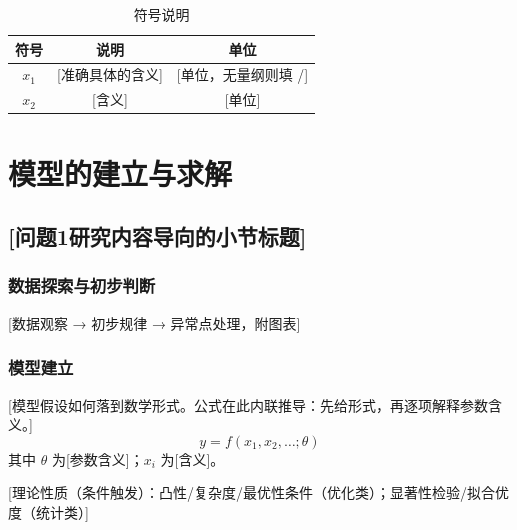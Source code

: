 \documentclass[12pt,a4paper]{ctexart}
\begin{document}
\begin{table}[H]
\centering
\caption{符号说明}
\begin{tabular}{ccc}
\toprule
符号 & 说明 & 单位 \\
\midrule
$x_1$ & [准确具体的含义] & [单位，无量纲则填 /] \\
$x_2$ & [含义] & [单位] \\
\bottomrule
\end{tabular}
\end{table}

\section{模型的建立与求解}

\subsection{[问题1研究内容导向的小节标题]}

\subsubsection{数据探索与初步判断}

[数据观察 → 初步规律 → 异常点处理，附图表]

\subsubsection{模型建立}

[模型假设如何落到数学形式。公式在此内联推导：先给形式，再逐项解释参数含义。]
\begin{equation}
y = f(x_1, x_2, \ldots; \theta)
\end{equation}
其中 $\theta$ 为[参数含义]；$x_i$ 为[含义]。

[理论性质（条件触发）：凸性/复杂度/最优性条件（优化类）；显著性检验/拟合优度（统计类）]
\end{document}
